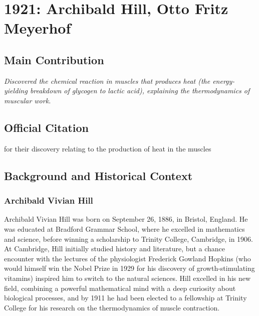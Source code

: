 \chapter[1921 --- Hill et al.]{1921: Archibald Hill, Otto Fritz Meyerhof}
\label{ch:1921_Hill}

\section*{Main Contribution}

\textit{Discovered the chemical reaction in muscles that produces heat (the energy-yielding breakdown of glycogen to lactic acid), explaining the thermodynamics of muscular work.}

\section{Official Citation}

for their discovery relating to the production of heat in the muscles

\section{Background and Historical Context}

\subsection{Archibald Vivian Hill}

Archibald Vivian Hill was born on September 26, 1886, in Bristol, England. He was educated at Bradford Grammar School, where he excelled in mathematics and science, before winning a scholarship to Trinity College, Cambridge, in 1906. At Cambridge, Hill initially studied history and literature, but a chance encounter with the lectures of the physiologist Frederick Gowland Hopkins (who would himself win the Nobel Prize in 1929 for his discovery of growth-stimulating vitamins) inspired him to switch to the natural sciences. Hill excelled in his new field, combining a powerful mathematical mind with a deep curiosity about biological processes, and by 1911 he had been elected to a fellowship at Trinity College for his research on the thermodynamics of muscle contraction.

